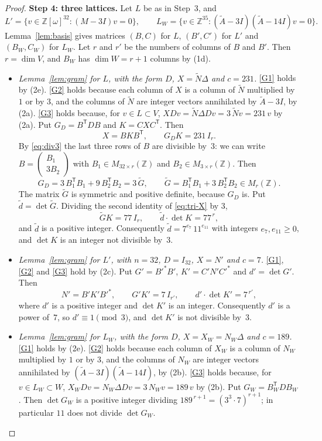 \documentclass[11pt,a4paper]{article}
\theoremstyle{remark}
\newcommand{\ZZ}{\mathbb{Z}}
\newcommand{\tp}{\mathsf{T}}
\newcommand{\tA}{\widetilde{A}}
\newcommand{\tN}{\widetilde{N}}
\newcommand{\tG}{\widetilde{G}}
\newcommand{\td}{\widetilde{d}}
\begin{document}
\begin{proof}
\medskip\noindent\textbf{Step 4: three lattices.}
Let $L$ be as in Step~3, and
\[
L'=\{v\in\ZZ[\omega]^{32}:(M-3I)v=0\},\qquad L_W=\{v\in\ZZ^{35}:(\tA-3I)(\tA-14I)v=0\}.
\]
Lemma~\ref{lem:basis} gives matrices $(B,C)$ for $L$, $(B',C')$ for $L'$ and $(B_W,C_W)$ for $L_W$. Let $r$ and
$r'$ be the numbers of columns of $B$ and $B'$. Then $r=\dim V$, and $B_W$ has $\dim W=r+1$ columns by (1d).
\begin{itemize}[leftmargin=*]
\item \emph{Lemma~\ref{lem:gram} for $L$, with the form $D$, $X=\tN\Delta$ and $c=231$.} \ref{G1} holds by (2e).
\ref{G2} holds because each column of $X$ is a column of $\tN$ multiplied by $1$ or by $3$, and the columns of $\tN$
are integer vectors annihilated by $\tA-3I$, by (2a). \ref{G3} holds because, for $v\in L\subset V$,
$XDv=\tN\Delta Dv=3\,\tN v=231\,v$ by (2a). Put $G_D=B^{\tp}DB$ and $K=CXC^{\tp}$. Then
\begin{equation}\label{eq:tri-X}
X=BKB^{\tp},\qquad G_DK=231\,I_r .
\end{equation}
By \eqref{eq:div3} the last three rows of $B$ are divisible by~$3$: we can write
$B=\begin{pmatrix}B_1\\3B_2\end{pmatrix}$ with $B_1\in M_{32\times r}(\ZZ)$ and $B_2\in M_{3\times r}(\ZZ)$. Then
\[
G_D=3\,B_1^{\tp}B_1+9\,B_2^{\tp}B_2=3\,\tG,\qquad \tG=B_1^{\tp}B_1+3\,B_2^{\tp}B_2\in M_r(\ZZ).
\]
The matrix $\tG$ is symmetric and positive definite, because $G_D$ is. Put $\td=\det\tG$. Dividing the second
identity of \eqref{eq:tri-X} by $3$,
\begin{equation}\label{eq:tri-G}
\tG K=77\,I_r,\qquad \td\cdot\det K=77^{\,r},
\end{equation}
and $\td$ is a positive integer. Consequently $\td=7^{e_7}\,11^{e_{11}}$ with integers $e_7,e_{11}\ge0$, and
$\det K$ is an integer not divisible by~$3$.
\item \emph{Lemma~\ref{lem:gram} for $L'$, with $n=32$, $D=I_{32}$, $X=N'$ and $c=7$.} \ref{G1}, \ref{G2} and
\ref{G3} hold by (2c). Put $G'=B'^*B'$, $K'=C'N'C'^*$ and $d'=\det G'$. Then
\begin{equation}\label{eq:tri-Np}
N'=B'K'B'^*,\qquad G'K'=7\,I_{r'},\qquad d'\cdot\det K'=7^{\,r'},
\end{equation}
where $d'$ is a positive integer and $\det K'$ is an integer. Consequently $d'$ is a power of~$7$, so
$d'\equiv1\pmod3$, and $\det K'$ is not divisible by~$3$.
\item \emph{Lemma~\ref{lem:gram} for $L_W$, with the form $D$, $X=X_W=N_W\Delta$ and $c=189$.} \ref{G1} holds by
(2e). \ref{G2} holds because each column of $X_W$ is a column of $N_W$ multiplied by $1$ or by $3$, and the columns of
$N_W$ are integer vectors annihilated by $(\tA-3I)(\tA-14I)$, by (2b). \ref{G3} holds because, for
$v\in L_W\subset W$, $X_WDv=N_W\Delta Dv=3\,N_Wv=189\,v$ by (2b). Put $G_W=B_W^{\tp}DB_W$. Then $\det G_W$ is a
positive integer dividing $189^{\,r+1}=(3^3\cdot7)^{r+1}$; in particular $11$ does not divide $\det G_W$.
\end{itemize}


\end{proof}
\end{document}
